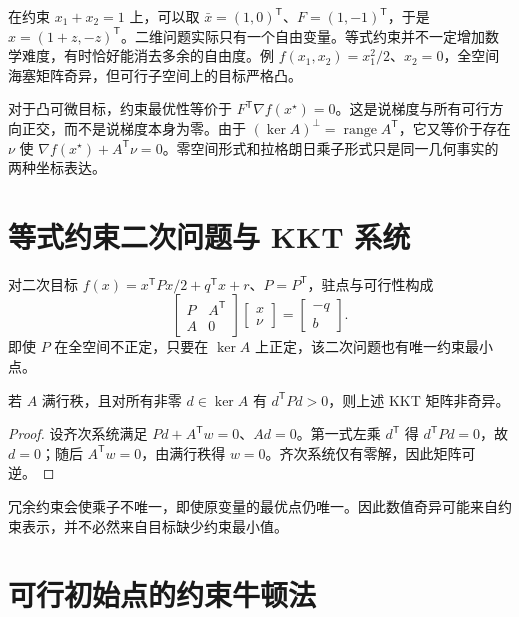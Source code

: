 \documentclass[UTF8,12pt,a4paper,fontset=fandol]{ctexbook}
\begin{document}
在约束 $x_1+x_2=1$ 上，可以取 $\bar x=(1,0)^{\mathsf T}$、$F=(1,-1)^{\mathsf T}$，于是 $x=(1+z,-z)^{\mathsf T}$。二维问题实际只有一个自由变量。等式约束并不一定增加数学难度，有时恰好能消去多余的自由度。例 $f(x_1,x_2)=x_1^2/2$、$x_2=0$，全空间海塞矩阵奇异，但可行子空间上的目标严格凸。

对于凸可微目标，约束最优性等价于 $F^{\mathsf T}\nabla f(x^\star)=0$。这是说梯度与所有可行方向正交，而不是说梯度本身为零。由于 $(\ker A)^\perp=\operatorname{range}A^{\mathsf T}$，它又等价于存在 $\nu$ 使 $\nabla f(x^\star)+A^{\mathsf T}\nu=0$。零空间形式和拉格朗日乘子形式只是同一几何事实的两种坐标表达。

\section{等式约束二次问题与 KKT 系统}

对二次目标 $f(x)=x^{\mathsf T}Px/2+q^{\mathsf T}x+r$、$P=P^{\mathsf T}$，驻点与可行性构成
\[
 \begin{bmatrix}P&A^{\mathsf T}\\A&0\end{bmatrix}
 \begin{bmatrix}x\\\nu\end{bmatrix}
 =\begin{bmatrix}-q\\b\end{bmatrix}.
\]
即使 $P$ 在全空间不正定，只要在 $\ker A$ 上正定，该二次问题也有唯一约束最小点。

\begin{proposition}
若 $A$ 满行秩，且对所有非零 $d\in\ker A$ 有 $d^{\mathsf T}Pd>0$，则上述 KKT 矩阵非奇异。
\end{proposition}
\begin{proof}
设齐次系统满足 $Pd+A^{\mathsf T}w=0$、$Ad=0$。第一式左乘 $d^{\mathsf T}$ 得 $d^{\mathsf T}Pd=0$，故 $d=0$；随后 $A^{\mathsf T}w=0$，由满行秩得 $w=0$。齐次系统仅有零解，因此矩阵可逆。
\end{proof}
冗余约束会使乘子不唯一，即使原变量的最优点仍唯一。因此数值奇异可能来自约束表示，并不必然来自目标缺少约束最小值。

\section{可行初始点的约束牛顿法}
\end{document}
